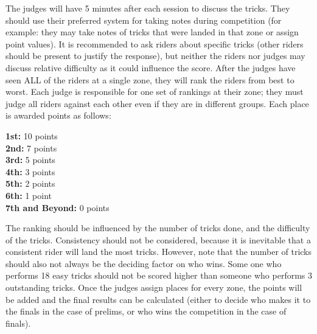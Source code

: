 The judges will have 5 minutes after each session to discuss the tricks.
They should use their preferred system for taking notes during competition (for example: they may take notes of tricks that were landed in that zone or assign point values).
It is recommended to ask riders about specific tricks (other riders should be present to justify the response), but neither the riders nor judges may discuss relative difficulty as it could influence the score.
After the judges have seen ALL of the riders at a single zone, they will rank the riders from best to worst.
Each judge is responsible for one set of rankings at their zone; they must judge all riders against each other even if they are in different groups.
Each place is awarded points as follows:

\textbf{1st:} 10 points\\
\textbf{2nd:} 7 points\\
\textbf{3rd:} 5 points\\
\textbf{4th:} 3 points\\
\textbf{5th:} 2 points\\
\textbf{6th:} 1 point\\ 
\textbf{7th and Beyond:} 0 points

The ranking should be influenced by the number of tricks done, and the difficulty of the tricks.
Consistency should not be considered, because it is inevitable that a consistent rider will land the most tricks.
However, note that the number of tricks
should also not always be the deciding factor on who wins.
Some one who performs 18 easy tricks should not be scored higher than someone who performs 3 outstanding tricks.
Once the judges assign places for every zone, the points will be added and the final results can be calculated (either to decide who makes it to the finals in the case of prelims, or who wins the competition in the case of finals).
